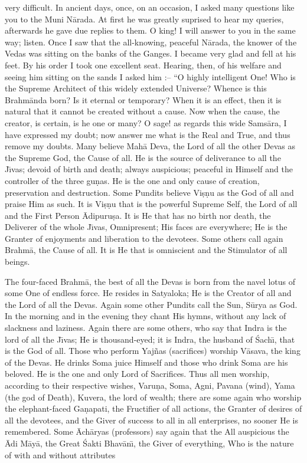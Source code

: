 very difficult. In ancient days, once, on an occasion, I asked many questions like you to the Muni N\=arada. At first he was greatly suprised to hear my queries, afterwards he gave due replies to them. O king! I will answer to you in the same way; listen. Once I saw that the all-knowing, peaceful N\=arada, the knower of the Vedas was sitting on the banks of the Ganges. I became very glad and fell at his feet. By his order I took one excellent seat. Hearing, then, of his welfare and seeing him sitting on the sands I asked him :-- ``O highly intelligent One! Who is the Supreme Architect of this widely extended Universe? Whence is this Brahm\=anda born? Is it eternal or temporary? When it is an effect, then it is natural that it cannot be created without a cause. Now when the cause, the creator, is certain, is he one or many? O sage! as regards this wide Sams\=ara, I have expressed my doubt; now answer me what is the Real and True, and thus remove my doubts. Many believe Mah\=a Deva, the Lord of all the other Devas as the Supreme God, the Cause of all. He is the source of deliverance to all the J\={\i}vas; devoid of birth and death; always auspicious; peaceful in Himself and the controller of the three gu\d{n}as. He is the one and only cause of creation, preservation and destruction. Some Pundits believe Vi\d{s}\d{n}u as the God of all and praise Him as such. It is Vi\d{s}\d{n}u that is the powerful Supreme Self, the Lord of all and the First Person \=Adipuru\d{s}a. It is He that has no birth nor death, the Deliverer of the whole J\={\i}vas, Omnipresent; His faces are everywhere; He is the Granter of enjoyments and liberation to the devotees. Some others call again Brahm\=a, the Cause of all. It is He that is omniscient and the Stimulator of all beings.

The four-faced Brahm\=a, the best of all the Devas is born from the navel lotus of some One of endless force. He resides in Satyaloka; He is the Creator of all and the Lord of all the Devas. Again some other Pundits call the Sun, S\=urya as God. In the morning and in the evening they chant His hymns, without any lack of slackness and laziness. Again there are some others, who say that Indra is the lord of all the J\={\i}vas; He is thousand-eyed; it is Indra, the husband of \'Sach\={\i}, that is the God of all. Those who perform Yaj\~nas (sacrifices) worship V\=asava, the king of the Devas. He drinks Soma juice Himself and those who drink Soma are his beloved. He is the one and only Lord of Sacrifices. Thus all men worship, according to their respective wishes, Varu\d{n}a, Soma, Agni, Pavana (wind), Yama (the god of Death), Kuvera, the lord of wealth; there are some again who worship the elephant-faced Ga\d{n}apati, the Fructifier of all actions, the Granter of desires of all the devotees, and the Giver of success to all in all enterprises, no sooner He is remembered. Some \=Ach\=aryas (professors) say again that the All auspicious the \=Adi M\=ay\=a, the Great \'Sakti Bhav\=an\={\i}, the Giver of everything, Who is the nature of with and without attributes

